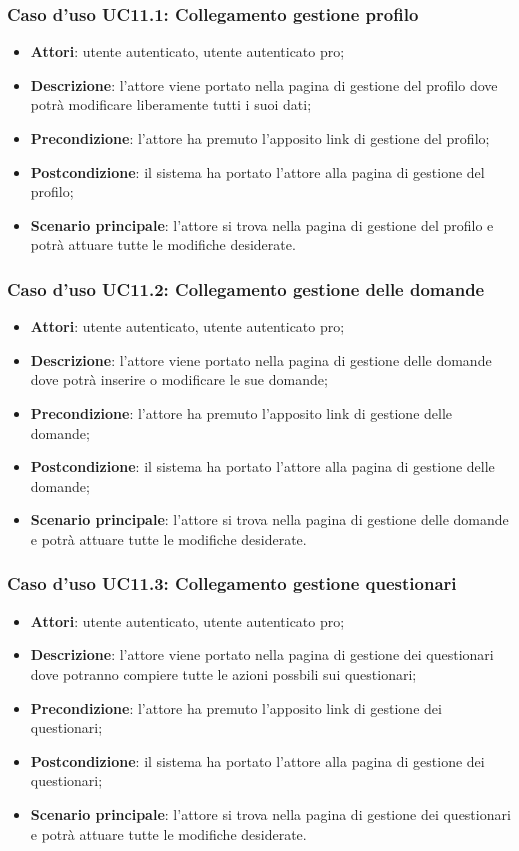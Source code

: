 \subsubsection{Caso d'uso UC11.1: Collegamento gestione profilo}
\begin{itemize}
\item\textbf{Attori}: utente autenticato, utente autenticato pro;
\item\textbf{Descrizione}: l'attore viene portato nella pagina di gestione del profilo dove potrà modificare liberamente tutti i suoi dati;
\item\textbf{Precondizione}: l'attore ha premuto l'apposito link di gestione del profilo;
\item\textbf{Postcondizione}: il sistema ha portato l'attore alla pagina di gestione del profilo;
\item\textbf{Scenario principale}: l'attore si trova nella pagina di gestione del profilo e potrà attuare tutte le modifiche desiderate.
\end{itemize}

\subsubsection{Caso d'uso UC11.2: Collegamento gestione delle domande}
\begin{itemize}
\item\textbf{Attori}: utente autenticato, utente autenticato pro;
\item\textbf{Descrizione}: l'attore viene portato nella pagina di gestione delle domande dove potrà inserire o modificare le sue domande;
\item\textbf{Precondizione}: l'attore ha premuto l'apposito link di gestione delle domande;
\item\textbf{Postcondizione}: il sistema ha portato l'attore alla pagina di gestione delle domande;
\item\textbf{Scenario principale}: l'attore si trova nella pagina di gestione delle domande e potrà attuare tutte le modifiche desiderate.
\end{itemize}

\subsubsection{Caso d'uso UC11.3: Collegamento gestione questionari}
\begin{itemize}
\item\textbf{Attori}: utente autenticato, utente autenticato pro;
\item\textbf{Descrizione}: l'attore viene portato nella pagina di gestione dei questionari dove potranno compiere tutte le azioni possbili sui questionari;
\item\textbf{Precondizione}: l'attore ha premuto l'apposito link di gestione dei questionari;
\item\textbf{Postcondizione}: il sistema ha portato l'attore alla pagina di gestione dei questionari;
\item\textbf{Scenario principale}: l'attore si trova nella pagina di gestione dei questionari e potrà attuare tutte le modifiche desiderate.
\end{itemize}

